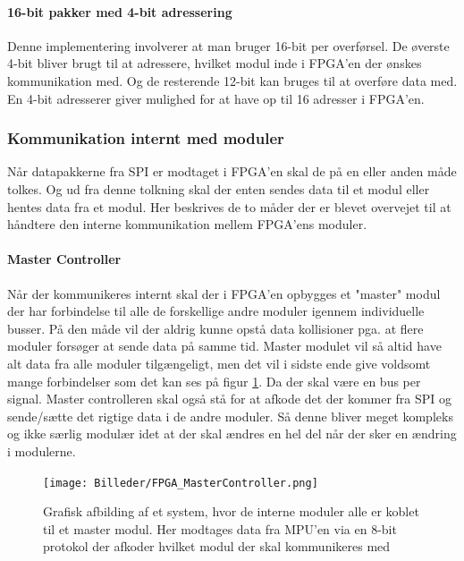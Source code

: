\paragraph*{16-bit pakker med 4-bit adressering}
Denne implementering involverer at man bruger 16-bit per overførsel. De øverste 4-bit bliver brugt til at adressere, hvilket modul inde i FPGA'en der ønskes kommunikation med. Og de resterende 12-bit kan bruges til at overføre data med. En 4-bit adresserer giver mulighed for at have op til 16 adresser i FPGA'en.

\subsubsection{Kommunikation internt med moduler}
Når datapakkerne fra SPI er modtaget i FPGA'en skal de på en eller anden måde tolkes. Og ud fra denne tolkning skal der enten sendes data til et modul eller hentes data fra et modul. Her beskrives de to måder der er blevet overvejet til at håndtere den interne kommunikation mellem FPGA'ens moduler.

\paragraph*{Master Controller}
Når der kommunikeres internt skal der i FPGA'en opbygges et "master" modul der har forbindelse til alle de forskellige andre moduler igennem individuelle busser. På den måde vil der aldrig kunne opstå data kollisioner pga. at flere moduler forsøger at sende data på samme tid. Master modulet vil så altid have alt data fra alle moduler tilgængeligt, men det vil i sidste ende give voldsomt mange forbindelser som det kan ses på figur \ref{fig:FPGA_MasterController}. Da der skal være en bus per signal. Master controlleren skal også stå for at afkode det der kommer fra SPI og sende/sætte det rigtige data i de andre moduler. Så denne bliver meget kompleks og ikke særlig modulær idet at der skal ændres en hel del når der sker en ændring i modulerne.

\begin{figure}[ht]
	\begin{center}
		\texttt{[image: Billeder/FPGA\_MasterController.png]}
	\end{center}
\caption{Grafisk afbilding af et system, hvor de interne moduler alle er koblet til et master modul. Her modtages data fra MPU'en via en 8-bit protokol der afkoder hvilket modul der skal kommunikeres med}
\label{fig:FPGA_MasterController}
\end{figure}

